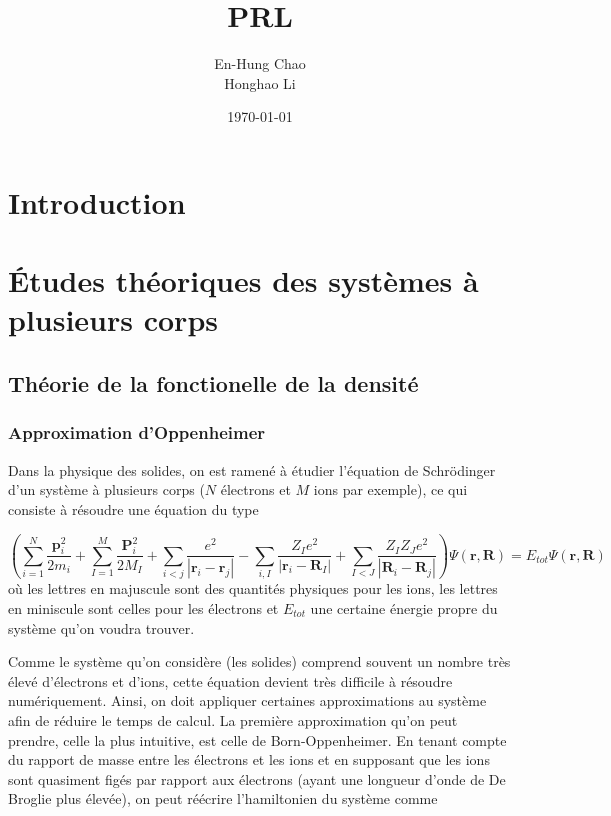 \documentclass[12pt, french]{report}
\title{PRL}
\author{En-Hung Chao \\ Honghao Li}
\date{\today}
\theoremstyle{theoreme}
\begin{document}
\maketitle

\newpage
\tableofcontents

\newpage
\chapter{Introduction}


\chapter{Études théoriques des systèmes à plusieurs corps}
\section{Théorie de la fonctionelle de la densité}
\subsection{Approximation d'Oppenheimer}
Dans la physique des solides, on est ramené à étudier l'équation de Schrödinger d'un système à plusieurs corps ($N$ électrons et $M$ ions par exemple), ce qui consiste à résoudre une équation du type

$$
(\sum_{i=1}^N \frac{\textbf{p}_i^2}{2m_i} + \sum_{I=1}^M \frac{\textbf{P}_i^2}{2M_I}
+ \sum_{i<j}\frac{e^2}{| \textbf{r}_i - \textbf{r}_j |} - \sum_{i, I}\frac{Z_I e^2}{| \textbf{r}_i
- \textbf{R}_I |} + \sum_{I<J}\frac{Z_I Z_J e^2}{| \textbf{R}_i - \textbf{R}_j |} ) \Psi(\textbf{r}, \textbf{R}) = E_{tot} \Psi(\textbf{r}, \textbf{R})
$$
où les lettres en majuscule sont des quantités physiques pour les ions, les lettres en miniscule sont celles pour les électrons et $E_{tot}$ une certaine énergie propre du système qu'on voudra trouver.

Comme le système qu'on considère (les solides) comprend souvent un nombre très élevé d'électrons et d'ions, cette équation devient très difficile à résoudre numériquement. Ainsi, on doit appliquer certaines approximations au système afin de réduire le temps de calcul. La première approximation qu'on peut prendre, celle la plus intuitive, est celle de Born-Oppenheimer. En tenant compte du rapport de masse entre les électrons et les ions et en supposant que les ions sont quasiment figés par rapport aux électrons (ayant une longueur d'onde de De Broglie plus élevée), on peut réécrire l'hamiltonien du système comme
\end{document}
